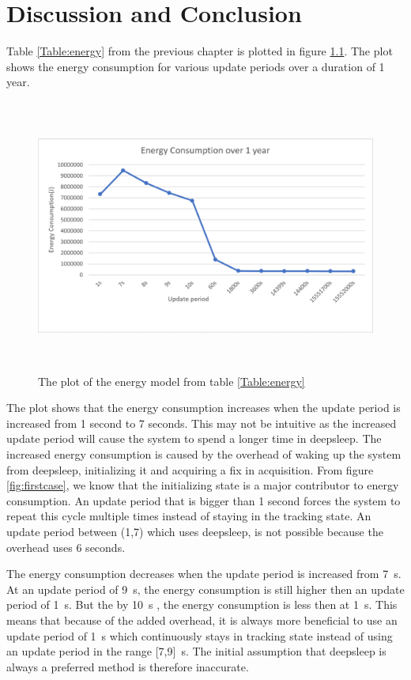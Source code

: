 \chapter{Discussion and Conclusion}
Table \ref{Table:energy} from the previous chapter is plotted in figure \ref{fig:energyconsumption}. The plot shows the energy consumption for various update periods over a duration of 1 year.

\begin{figure}[H]
\centering
\includegraphics[height=9.0cm]{Project_Report/Images/energyconsumption.PNG}
\caption{The plot of the energy model from table \ref{Table:energy}}
\label{fig:energyconsumption}
\end{figure}

The plot shows that the energy consumption increases when the update period is increased from 1 second to 7 seconds. This may not be intuitive as the increased update period will cause the system to spend a longer time in deepsleep. The increased energy consumption is caused by the overhead of waking up the system from deepsleep, initializing it and acquiring a fix in acquisition. From figure \ref{fig:firstcase}, we know that the initializing state is a major contributor to energy consumption. An update period that is bigger than  1 second forces the system to repeat this cycle multiple times instead of staying in the tracking state. An update period between (1,7) which uses deepsleep, is not possible because the overhead uses 6 seconds.

The energy consumption decreases when the update period is increased from 7 \,s. At an update period of 9 \,s, the energy consumption is still higher then an update period of 1 \,s. But the by 10 \,s , the energy consumption is less then at 1 \,s. This means that because of the added overhead, it is always more beneficial to use an update period of 1 \,s which continuously stays in tracking state instead of using an update period in the range [7,9] \,s. The initial assumption that deepsleep is always a preferred method is therefore inaccurate. 

